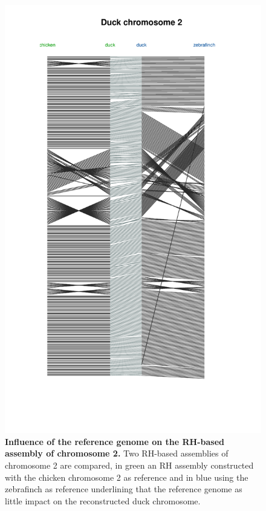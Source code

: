 \documentclass[10pt,letterpaper]{article}
\DeclareRobustCommand{\csentence}[1]{
    {\mathversion{bold}\bfseries #1}}
\begin{document}
\begin{figure}[h!]
   \includegraphics[scale=0.7]{figure2_chicken_duck_zebrafinch.pdf}
  \caption{\csentence{Influence of the reference genome on the RH-based assembly of chromosome 2.} Two RH-based assemblies of chromosome 2 are compared, in green an RH assembly constructed with the chicken chromosome 2 as reference and in blue using the zebrafinch as reference underlining that the reference genome as little impact on the reconstructed duck chromosome.}
\label{fig2}
\end{figure}
\end{document}
